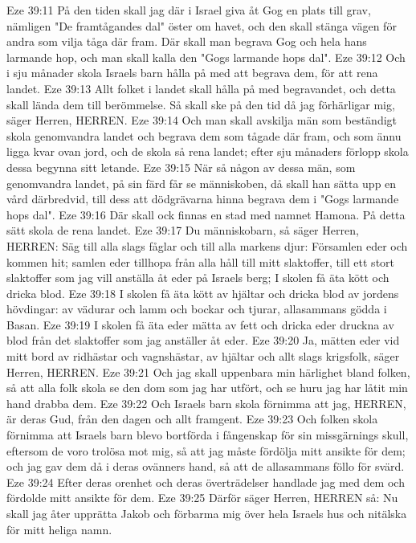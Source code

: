 Eze 39:11  På den tiden skall jag där i Israel giva åt Gog en plats till grav, nämligen "De framtågandes dal" öster om havet, och den skall stänga vägen för andra som vilja tåga där fram. Där skall man begrava Gog och hela hans larmande hop, och man skall kalla den "Gogs larmande hops dal".
Eze 39:12  Och i sju månader skola Israels barn hålla på med att begrava dem, för att rena landet.
Eze 39:13  Allt folket i landet skall hålla på med begravandet, och detta skall lända dem till berömmelse. Så skall ske på den tid då jag förhärligar mig, säger Herren, HERREN.
Eze 39:14  Och man skall avskilja män som beständigt skola genomvandra landet och begrava dem som tågade där fram, och som ännu ligga kvar ovan jord, och de skola så rena landet; efter sju månaders förlopp skola dessa begynna sitt letande.
Eze 39:15  När så någon av dessa män, som genomvandra landet, på sin färd får se människoben, då skall han sätta upp en vård därbredvid, till dess att dödgrävarna hinna begrava dem i "Gogs larmande hops dal".
Eze 39:16  Där skall ock finnas en stad med namnet Hamona. På detta sätt skola de rena landet.
Eze 39:17  Du människobarn, så säger Herren, HERREN: Säg till alla slags fåglar och till alla markens djur: Församlen eder och kommen hit; samlen eder tillhopa från alla håll till mitt slaktoffer, till ett stort slaktoffer som jag vill anställa åt eder på Israels berg; I skolen få äta kött och dricka blod.
Eze 39:18  I skolen få äta kött av hjältar och dricka blod av jordens hövdingar: av vädurar och lamm och bockar och tjurar, allasammans gödda i Basan.
Eze 39:19  I skolen få äta eder mätta av fett och dricka eder druckna av blod från det slaktoffer som jag anställer åt eder.
Eze 39:20  Ja, mätten eder vid mitt bord av ridhästar och vagnshästar, av hjältar och allt slags krigsfolk, säger Herren, HERREN.
Eze 39:21  Och jag skall uppenbara min härlighet bland folken, så att alla folk skola se den dom som jag har utfört, och se huru jag har låtit min hand drabba dem.
Eze 39:22  Och Israels barn skola förnimma att jag, HERREN, är deras Gud, från den dagen och allt framgent.
Eze 39:23  Och folken skola förnimma att Israels barn blevo bortförda i fångenskap för sin missgärnings skull, eftersom de voro trolösa mot mig, så att jag måste fördölja mitt ansikte för dem; och jag gav dem då i deras ovänners hand, så att de allasammans föllo för svärd.
Eze 39:24  Efter deras orenhet och deras överträdelser handlade jag med dem och fördolde mitt ansikte för dem.
Eze 39:25  Därför säger Herren, HERREN så: Nu skall jag åter upprätta Jakob och förbarma mig över hela Israels hus och nitälska för mitt heliga namn.

